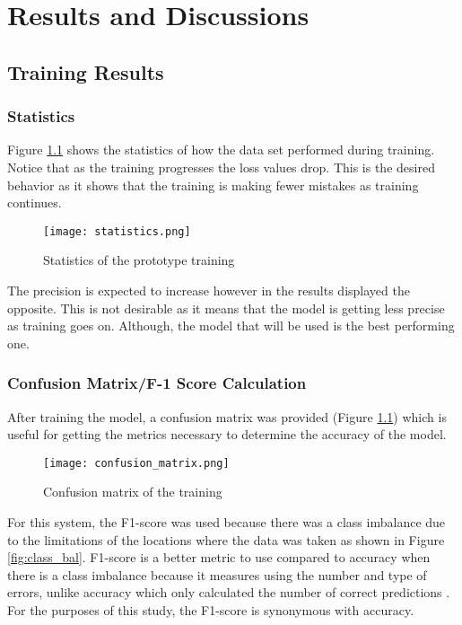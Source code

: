 \chapter{Results and Discussions}
 

\section{Training Results}

\subsection{Statistics}

Figure \ref{fig:res} shows the statistics of how the data set performed during training.
Notice that as the training progresses the loss values drop. This is the desired behavior as it shows that the training is making fewer mistakes as training continues.


\begin{figure}[h!]
	\texttt{[image: statistics.png]}
	\caption{Statistics of the prototype training}
	\label{fig:res}
\end{figure}

\newpage
The precision is expected to increase however in the results displayed the opposite. This is not desirable as it means that the model is getting less precise as training goes on. Although, the model that will be used is the best performing one.

\subsection{Confusion Matrix/F-1 Score Calculation}
After training the model, a confusion matrix was provided (Figure \ref{fig:res}) which is useful for getting the metrics necessary to determine the accuracy of the model.

\begin{figure}[h!]
	\texttt{[image: confusion\_matrix.png]}
	\caption{Confusion matrix of the training}
	\label{fig:con_mat}
\end{figure}

For this system, the F1-score was used because there was a class imbalance due to the limitations of the locations where the data was taken as shown in Figure \ref{fig:class_bal}. F1-score is a better metric to use compared to accuracy when there is a class imbalance because it measures using the number and type of errors, unlike accuracy which only calculated the number of correct predictions \cite{Korstanje_2021}. For the purposes of this study, the F1-score is synonymous with accuracy.


